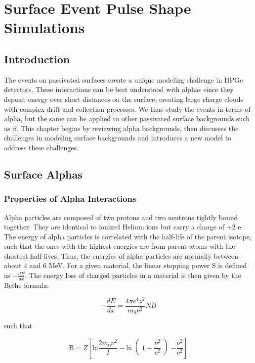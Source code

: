 \chapter{Surface Event Pulse Shape Simulations}

\section{Introduction}

The events on passivated surfaces create a unique modeling challenge in HPGe detectors. These interactions can be best understood with alphas since they deposit energy over short distances on the surface, creating large charge clouds with complex drift and collection processes. We thus study the events in terms of alpha, but the same can be applied to other passivated surface backgrounds such as $\beta$. This chapter begins by reviewing alpha backgrounds, then discusses the challenges in modeling surface backgrounds and introduces a new model to address these challenges.



\section{Surface Alphas}
\label{ch3_sec_alpha}
\subsection{Properties of Alpha Interactions}
Alpha particles are composed of two protons and two neutrons tightly bound together. They are identical to ionized Helium ions but carry a charge of $+2$ e. The energy of alpha particles is correlated with the half-life of the parent isotope, such that the ones with the highest energies are from parent atoms with the shortest half-lives. Thus, the energies of alpha particles are normally between about $4$ and $6$ MeV. For a given material, the linear stopping power S is defined as $-\frac{dE}{dx}$. The energy loss of charged particles in a material is then given by the Bethe formula:

\begin{equation}\label{bethe_formula}
    -\frac{dE}{dx} = \frac{4\pi e^4z^2}{m_0\nu^2}NB
\end{equation}

such that

\begin{equation}\label{bethe_B}
    \text{B}=Z\left[ \text{ln}\frac{2m_0\nu^2}{I}-\text{ln}\right(1-\frac{\nu^2}{c^2}\left)-\frac{\nu^2}{c^2}\right]
\end{equation}

